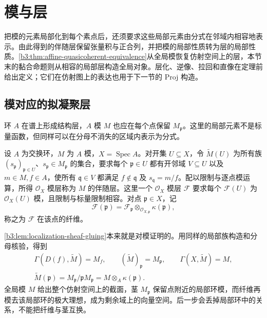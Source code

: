 
\section{模与层}
\label{b3:sec:2402}

把模的元素局部化到每个素点后，还须要求这些局部元素由分式在邻域内相容地表示。由此得到的伴随层保留张量积与正合列，并把模的局部性质转为层的局部性质。\cref{b3:thm:affine-quasicoherent-equivalence}从全局模恢复仿射空间上的层，本节末的黏合命题则从相容的局部层构造全局对象。层化、逆像、拉回和直像在定理前给出定义；它们在仿射图上的表达也用于下一节的 Proj 构造。


%
%
%

\subsection{模对应的拟凝聚层}
\label{b3:subsec:2402:01}

环 \(A\) 在谱上形成结构层，\(A\) 模 \(M\) 也应在每个点保留 \(M_{\mathfrak p}\)。这里的局部元素不是标量函数，但同样可以在分母不消失的区域内表示为分式。

\begin{definition}\label{b3:def:associated-module-sheaf}
	设 \(A\) 为交换环，\(M\) 为 \(A\) 模，\(X=\operatorname{Spec}A\)。对开集 \(U\subseteq X\)，令 \(\widetilde M(U)\) 为所有族 \((s_{\mathfrak p})_{\mathfrak p\in U}\)、\(s_{\mathfrak p}\in M_{\mathfrak p}\) 的集合，要求每个 \(\mathfrak p\in U\) 都有开邻域 \(V\subseteq U\) 以及 \(m\in M,f\in A\)，使所有 \(\mathfrak q\in V\) 都满足 \(f\notin\mathfrak q\) 及 \(s_{\mathfrak q}=m/f\)。配以限制与逐点模运算，所得 \(\mathcal O_X\) 模层称为 \(M\) 的伴随层。这里一个 \(\mathcal O_X\) 模层 \(\mathcal F\) 要求每个 \(\mathcal F(U)\) 为 \(\mathcal O_X(U)\) 模，且限制与标量限制相容。对点 \(\mathfrak p\in X\)，记
	\[
		\mathcal F(\mathfrak p) =\mathcal F_{\mathfrak p}\otimes_{\mathcal O_{X,\mathfrak p}}\kappa(\mathfrak p),
	\]
	称之为 \(\mathcal F\) 在该点的纤维。
\end{definition}

\cref{b3:lem:localization-sheaf-gluing}本来就是对模证明的。用同样的局部族构造和分母核验，得到
\begin{equation}\label{b3:eq:module-sheaf-localization}
	\begin{gathered}
		\Gamma(D(f),\widetilde M)=M_f,\qquad (\widetilde M)_{\mathfrak p}=M_{\mathfrak p},\qquad \Gamma(X,\widetilde M)=M,\\
		\widetilde M(\mathfrak p) =M_{\mathfrak p}/\mathfrak pM_{\mathfrak p} =M\otimes_A\kappa(\mathfrak p).
	\end{gathered}
\end{equation}
全局模 \(M\) 给出整个仿射空间上的截面，茎 \(M_{\mathfrak p}\) 保留点附近的局部环模，而纤维再模去该局部环的极大理想，成为剩余域上的向量空间。后一步会丢掉局部环中的关系，不能把纤维与茎互换。

